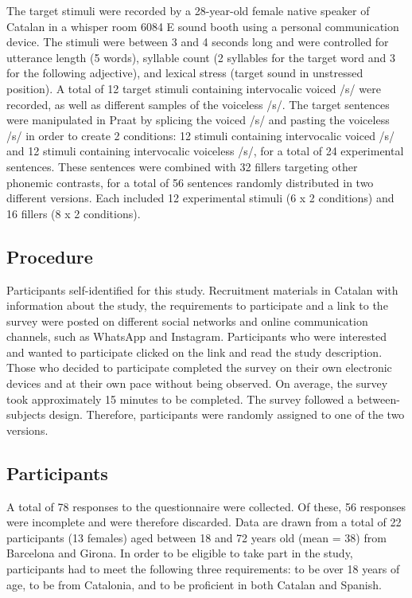 \documentclass[
  a4paper,
  11pt,
  twocolumn]{article}
\begin{document}
The target stimuli were recorded by a 28-year-old female native speaker
of Catalan in a whisper room 6084 E sound booth using a personal
communication device. The stimuli were between 3 and 4 seconds long and
were controlled for utterance length (5 words), syllable count (2
syllables for the target word and 3 for the following adjective), and
lexical stress (target sound in unstressed position). A total of 12
target stimuli containing intervocalic voiced /s/ were recorded, as well
as different samples of the voiceless /s/. The target sentences were
manipulated in Praat by splicing the voiced /s/ and pasting the
voiceless /s/ in order to create 2 conditions: 12 stimuli containing
intervocalic voiced /s/ and 12 stimuli containing intervocalic voiceless
/s/, for a total of 24 experimental sentences. These sentences were
combined with 32 fillers targeting other phonemic contrasts, for a total
of 56 sentences randomly distributed in two different versions. Each
included 12 experimental stimuli (6 x 2 conditions) and 16 fillers (8 x
2 conditions).

\subsection{Procedure}

Participants self-identified for this study. Recruitment materials in
Catalan with information about the study, the requirements to
participate and a link to the survey were posted on different social
networks and online communication channels, such as WhatsApp and
Instagram. Participants who were interested and wanted to participate
clicked on the link and read the study description. Those who decided to
participate completed the survey on their own electronic devices and at
their own pace without being observed. On average, the survey took
approximately 15 minutes to be completed. The survey followed a
between-subjects design. Therefore, participants were randomly assigned
to one of the two versions.

\subsection{Participants}

A total of 78 responses to the questionnaire were collected. Of these,
56 responses were incomplete and were therefore discarded. Data are
drawn from a total of 22 participants (13 females) aged between 18 and
72 years old (mean = 38) from Barcelona and Girona. In order to be
eligible to take part in the study, participants had to meet the
following three requirements: to be over 18 years of age, to be from
Catalonia, and to be proficient in both Catalan and Spanish.
\end{document}
